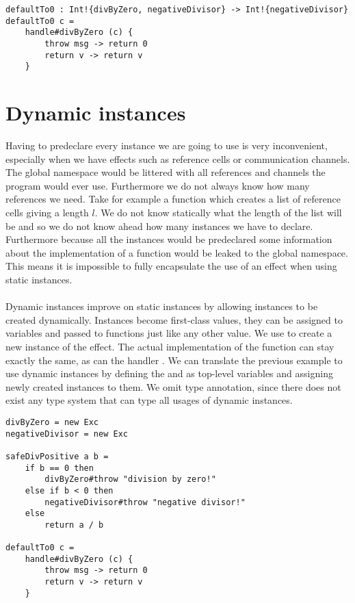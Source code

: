 \begin{verbatim}
defaultTo0 : Int!{divByZero, negativeDivisor} -> Int!{negativeDivisor}
defaultTo0 c =
	handle#divByZero (c) {
		throw msg -> return 0
		return v -> return v
	}
\end{verbatim}

\section{Dynamic instances} \label{section:background-dynamicinst}

Having to predeclare every instance we are going to use is very inconvenient, especially when we have effects such as reference cells or communication channels. The global namespace would be littered with all references and channels the program would ever use. Furthermore we do not always know how many references we need. Take for example a function which creates a list of reference cells giving a length $l$. We do not know statically what the length of the list will be and so we do not know ahead how many instances we have to declare.
Furthermore because all the instances would be predeclared some information about the implementation of a function would be leaked to the global namespace. This means it is impossible to fully encapsulate the use of an effect when using static instances.
\\\\
Dynamic instances improve on static instances by allowing instances to be created dynamically.
Instances become first-class values, they can be assigned to variables and passed to functions just like any other value.
We use  to create a new instance of the  effect.
The actual implementation of the function can stay exactly the same, as can the handler .
We can translate the previous example to use dynamic instances by defining the  and  as top-level variables and assigning newly created instances to them. We omit type annotation, since there does not exist any type system that can type all usages of dynamic instances.

\begin{verbatim}
divByZero = new Exc
negativeDivisor = new Exc

safeDivPositive a b =
	if b == 0 then
		divByZero#throw "division by zero!"
	else if b < 0 then
		negativeDivisor#throw "negative divisor!"
	else
		return a / b
		
defaultTo0 c =
	handle#divByZero (c) {
		throw msg -> return 0
		return v -> return v
	}
\end{verbatim}

